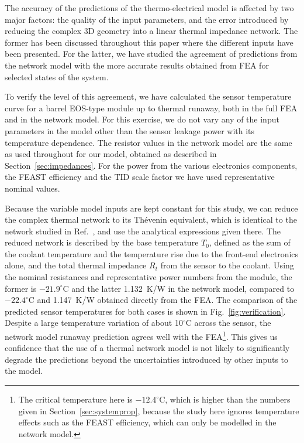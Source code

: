 The accuracy of the predictions of the thermo-electrical model is affected by two major factors: the quality of the input parameters, and the error introduced by reducing the complex 3D geometry into a linear thermal impedance network. The former has been discussed throughout this paper where the different inputs have been presented. For the latter, we have studied the agreement of predictions from the network model with the more accurate results obtained from FEA for selected states of the system.

To verify the level of this agreement, we have calculated the sensor temperature curve for a barrel EOS-type module up to thermal runaway, both in the full FEA and in the network model. For this exercise, we do not vary any of the input parameters in the model other than the sensor leakage power with its temperature dependence. The resistor values in the network model are the same as used throughout for our model, obtained as described in Section~\ref{sec:impedances}. For the power from the various electronics components, the FEAST efficiency and the TID scale factor we have used representative nominal values.

Because the variable model inputs are kept constant for this study, we can reduce the complex thermal network to its Th\'{e}venin equivalent, which is identical to the network studied in Ref.~\cite{Beck:2010zzd}, and use the analytical expressions given there. The reduced network is described by the base temperature $T_0$, defined as the sum of the coolant temperature and the temperature rise due to the front-end electronics alone, and the total thermal impedance $R_t$ from the sensor to the coolant. Using the nominal resistances and representative power numbers from the module, the former is $-21.9^\circ$C and the latter 1.132~K/W in the network model, compared to $-22.4^\circ$C and 1.147~K/W obtained directly from the FEA. The comparison of the predicted sensor temperatures for both cases is shown in Fig.~\ref{fig:verification}. Despite a large temperature variation of about 10$^\circ$C across the sensor, the network model runaway prediction agrees well with the FEA\footnote{The critical temperature here is $-12.4^\circ$C, which is higher than the numbers given in Section~\ref{sec:systemprop}, because the study here ignores temperature effects such as the FEAST efficiency, which can only be modelled in the network model.}. This gives us confidence that the use of a thermal network model is not likely to significantly degrade the predictions beyond the uncertainties introduced by other inputs to the model. 

